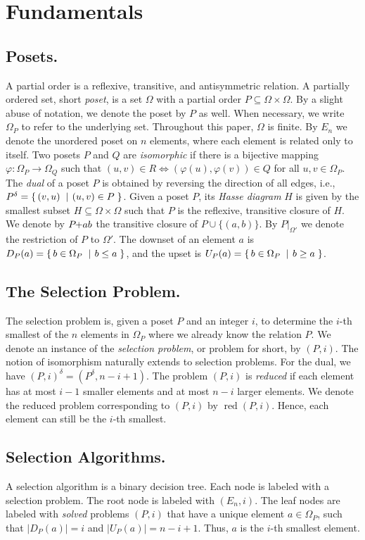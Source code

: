 \documentclass[a4paper,UKenglish,cleveref, autoref, thm-restate]{lipics-v2021}
\makeatletter
\newcommand{\set}[2]{\left\{\, \mathinner{#1}\vphantom{#2}\: \left|\: \vphantom{#1}\mathinner{#2} \right.\,\right\}}
\newcommand\ie{i.e\@., }
\newcommand{\sse}{\subseteq}
\newcommand{\pchild}[3]{{#1}\kern-1pt{+}{#2}{#3}}
\newcommand{\dual}[1]{{#1}^{\delta}}
\newcommand{\reduced}[1]{\operatorname{red}{#1}}
\newcommand{\less}[2]{D_{#1}(#2)}
\newcommand{\greater}[2]{U_{#1}(#2)}
\makeatother
\begin{document}
\section{Fundamentals}

\subsection{Posets.}
A partial order is a reflexive, transitive, and antisymmetric relation.
A partially ordered set, short \emph{poset}, is a set $\Omega$ with a partial order $P \subseteq \Omega \times \Omega$.
By a slight abuse of notation, we denote the poset by $P$ as well.
When necessary, we write $\Omega_P$ to refer to the underlying set.
Throughout this paper, $\Omega$ is finite.
By $E_n$ we denote the unordered poset on $n$ elements, where each element is related only to itself.
Two posets $P$ and $Q$ are \emph{isomorphic} if there is a bijective mapping $\varphi: \Omega_P \to \Omega_Q$ such that $(u, v) \in R \iff (\varphi(u), \varphi(v)) \in Q$ for all $u, v \in \Omega_P$.
The \emph{dual} of a poset $P$ is obtained by reversing the direction of all edges, \ie $\dual{P} = \set{(v,u)}{(u,v) \in P}$.
Given a poset $P$, its \emph{Hasse diagram} $H$ is given by the smallest subset $H \sse \Omega \times \Omega$ such that $P$ is the reflexive, transitive closure of $H$.
We denote by $\pchild{P}{a}{b}$ the transitive closure of $P \cup \{(a, b)\}$.
By $P|_{\Omega'}$ we denote the restriction of $P$ to $\Omega'$.
The downset of an element $a$ is $\less{P}{a} = \set{b \in \Omega_P}{b \le a}$, and the upset is $\greater{P}{a} = \set{b \in \Omega_P}{b \ge a}$.

\subsection{The Selection Problem.}
The selection problem is, given a poset $P$ and an integer $i$, to determine the $i$-th smallest of the $n$ elements in $\Omega_P$ where we already know the relation $P$.
We denote an instance of the \emph{selection problem}, or problem for short, by $(P, i)$.
The notion of isomorphism naturally extends to selection problems.
For the dual, we have $\dual{(P, i)} = (\dual{P}, n - i + 1)$.
The problem $(P, i)$ is \emph{reduced} if each element has at most $i - 1$ smaller elements and at most $n - i$ larger elements.
We denote the reduced problem corresponding to $(P, i)$ by $\reduced{(P, i)}$.
Hence, each element can still be the $i$-th smallest.

\subsection{Selection Algorithms.}
A selection algorithm is a binary decision tree.
Each node is labeled with a selection problem.
The root node is labeled with $(E_n, i)$.
The leaf nodes are labeled with \emph{solved} problems $(P, i)$ that have a unique element $a \in \Omega_P$, such that $|\less{P}{a}| = i$ and $|\greater{P}{a}| = n - i + 1$.
Thus, $a$ is the $i$-th smallest element.
\end{document}
